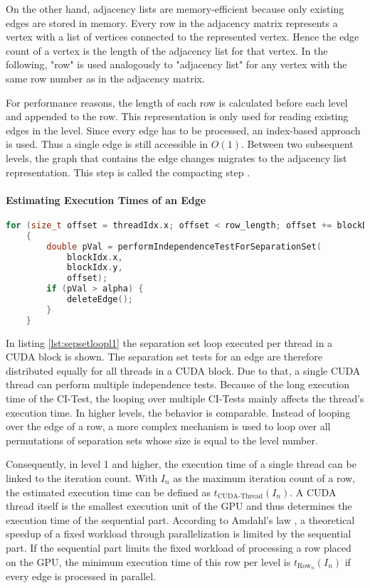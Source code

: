 On the other hand, adjacency lists are memory-efficient because only existing edges are stored in memory. Every row in the adjacency matrix represents a vertex with a list of vertices connected to the represented vertex. Hence the edge count of a vertex is the length of the adjacency list for that vertex. In the following, "row" is used analogously to "adjacency list" for any vertex with the same row number as in the adjacency matrix.

For performance reasons, the length of each row is calculated before each level and appended to the row. This representation is only used for reading existing edges in the level. Since every edge has to be processed, an index-based approach is used. Thus a single edge is still accessible in $O(1)$.
Between two subsequent levels, the graph that contains the edge changes migrates to the adjacency list representation. This step is called the compacting step \cite{zarebavaniCuPCCUDAbasedParallel2018}.
\newpage
\paragraph{Estimating Execution Times of an Edge}

\begin{lstlisting}[language=C++, caption=Separation set loop in level 1, label=lst:sepsetloopl1]
    for (size_t offset = threadIdx.x; offset < row_length; offset += blockDim.x)
    {
        double pVal = performIndependenceTestForSeparationSet(
            blockIdx.x,
            blockIdx.y,
            offset);
        if (pVal > alpha) {
            deleteEdge();
        }
    }
\end{lstlisting}

In listing \ref{lst:sepsetloopl1} the separation set loop executed per thread in a CUDA block is shown. The separation set tests for an edge are therefore distributed equally for all threads in a CUDA block. Due to that, a single CUDA thread can perform multiple independence tests. Because of the long execution time of the CI-Test, the looping over multiple CI-Tests mainly affects the thread's execution time. In higher levels, the behavior is comparable. Instead of looping over the edge of a row, a more complex mechanism is used to loop over all permutations of separation sets whose size is equal to the level number.

Consequently, in level 1 and higher, the execution time of a single thread can be linked to the iteration count. With $I_n$ as the maximum iteration count of a row, the estimated execution time can be defined as $t_{\text{CUDA-Thread}}(I_n)$. A CUDA thread itself is the smallest execution unit of the GPU and thus determines the execution time of the sequential part. According to Amdahl's law \cite{amdahlValiditySingleProcessor1967}, a theoretical speedup of a fixed workload through parallelization is limited by the sequential part. If the sequential part limits the fixed workload of processing a row placed on the GPU, the minimum execution time of this row per level is $t_{\text{Row}_n}(I_n)$ if every edge is processed in parallel.

